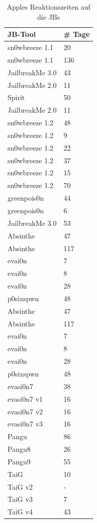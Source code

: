 \begin{table}[htp!]
    \begin{center}
        \begin{tabular}{|l|l|} \hline
           \textbf{JB-Tool} & \textbf{\# Tage} \\ \hline
sn0wbreeze	1.1 & 20 \\ \hline
sn0wbreeze 1.1 & 136 \\ \hline
JailbreakMe 3.0 & 43 \\ \hline
JailbreakMe 2.0 & 11\\ \hline
Spirit &	50\\ \hline
JailbreakMe 2.0 & 11\\ \hline
sn0wbreeze	1.2 & 48\\ \hline
sn0wbreeze	1.2 & 9\\ \hline
sn0wbreeze	 1.2 & 22\\ \hline
sn0wbreeze 1.2 & 37\\ \hline
sn0wbreeze	 1.2 & 15\\ \hline
sn0wbreeze 1.2 & 70\\ \hline
greenpois0n	& 44\\ \hline
greenpois0n	 & 6\\ \hline
JailbreakMe 3.0	& 53\\ \hline
Absinthe	 & 47\\ \hline
Absinthe	 & 117\\ \hline
evai0n	 & 7\\ \hline
evai0n	 & 8\\ \hline
evai0n	 & 28\\ \hline
p0sixspwn	 & 48\\ \hline
Absinthe	 & 47\\ \hline
Absinthe	 & 117\\ \hline
evai0n	 & 7\\ \hline
evai0n	& 8\\ \hline
evai0n	& 28\\ \hline
p0sixspwn	& 48 \\ \hline
evasi0n7 & 38 \\ \hline
evasi0n7 v1 & 16\\ \hline
evasi0n7 v2 & 16 \\ \hline
evasi0n7 v3 & 16 \\ \hline               
Pangu & 86 \\ \hline
Pangu8 & 26 \\ \hline
Pangu9 & 55 \\ \hline
TaiG & 10  \\ \hline
TaiG v2 & - \\ \hline
TaiG v3 & 7  \\ \hline
TaiG v4 & 43  \\ \hline
\end{tabular}
        \caption{Apples Reaktionszeiten auf die JBs  \protect\footnotemark}
        \label{tab:AppleReaktionszeitAll}
    \end{center}
\end{table}

